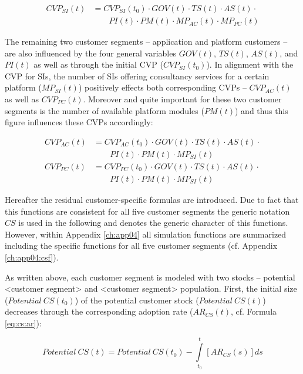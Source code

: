 \begin{align}
		CVP_{SI}(t) &= CVP_{SI}(t_0) \cdot GOV(t) \cdot TS(t) \cdot AS(t) \cdot \nonumber \\ &\qquad PI(t) \cdot PM(t) \cdot MP_{AC}(t) \cdot MP_{PC}(t)\label{eq:cvp:si}
\end{align}

The remaining two customer segments -- application and platform customers -- are also influenced by the four general variables $GOV(t)$, $TS(t)$, $AS(t)$, and $PI(t)$ as well as through the initial \ac{CVP} ($CVP_{SI}(t_0)$). In alignment with the \ac{CVP} for \acp{SI}, the number of \acp{SI} offering consultancy services for a certain platform ($MP_{SI}(t)$) positively effects both corresponding \acp{CVP} -- $CVP_{AC}(t)$ as well as $CVP_{PC}(t)$. Moreover and quite important for these two customer segments is the number of available platform modules ($PM(t)$) and thus this figure influences these \acp{CVP} accordingly:

\begin{align}
		CVP_{AC}(t) &= CVP_{AC}(t_0) \cdot GOV(t) \cdot TS(t) \cdot AS(t) \cdot \nonumber \\ &\qquad PI(t) \cdot PM(t) \cdot MP_{SI}(t)\label{eq:cvp:ac}\\
		CVP_ {PC}(t) &= CVP_{PC}(t_0) \cdot GOV(t) \cdot TS(t) \cdot AS(t) \cdot \nonumber \\ &\qquad PI(t) \cdot PM(t) \cdot MP_{SI}(t)\label{eq:cvp:pc}
\end{align}

Hereafter the residual customer-specific formulas are introduced. Due to fact that this functions are consistent for all five customer segments the generic notation $CS$ is used in the following and denotes the generic character of this functions. However, within Appendix \ref{ch:app04} all simulation functions are summarized including the specific functions for all five customer segments (cf. Appendix \ref{ch:app04:csf}).

As written above, each customer segment is modeled with two stocks -- potential <customer segment> and <customer segment> population. First, the initial size ($\mathit{Potential~CS(t_0)}$) of the potential customer stock \linebreak ($\mathit{Potential~CS(t)}$) decreases through the corresponding adoption rate \linebreak ($AR_{CS}(t)$, cf. Formula \ref{eq:cs:ar}):

\begin{equation}\label{eq:cs:pot}
	\mathit{Potential~CS(t)} =\mathit{Potential~CS(t_0)} - \int\limits_{t_0}^t  [AR_{CS}(s)]ds
\end{equation}

